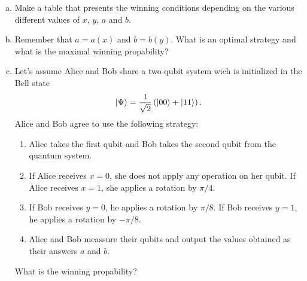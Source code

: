 \documentclass[a4paper,11pt]{article}
\begin{document}
\begin{enumerate}[a)]
    \item Make a table that presents the winning conditions depending on the
    various different values of $x$, $y$, $a$ and $b$.

    \item Remember that $a=a(x)$ and $b=b(y)$. What is an optimal strategy and
    what is the maximal winning propability?

    \item Let's assume Alice and Bob share a two-qubit system wich is
    initialized in the Bell state
    \begin{equation}
    \ket{\Psi} = \frac{1}{\sqrt 2} \left( \ket{00} + \ket{11}\right).
    \end{equation}
    Alice and Bob agree to use the following strategy:
    \begin{enumerate}[1.]
    \item Alice takes the first qubit and Bob takes the second qubit from the quantum system.
    \item If Alice receives $x=0$, she does not apply any operation on her
    qubit. If Alice receives $x=1$, she applies a rotation by $\pi/4$.
    \item If Bob receives $y=0$, he applies a rotation by $\pi/8$. If Bob receives $y=1$, he applies a rotation by $-\pi/8$.
    \item Alice and Bob meassure their qubits and output the values obtained as
    their answers $a$ and $b$.
    \end{enumerate}

    What is the winning propability?
\end{enumerate}
\end{document}
